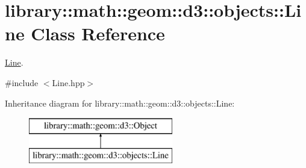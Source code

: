 \hypertarget{classlibrary_1_1math_1_1geom_1_1d3_1_1objects_1_1_line}{}\section{library\+:\+:math\+:\+:geom\+:\+:d3\+:\+:objects\+:\+:Line Class Reference}
\label{classlibrary_1_1math_1_1geom_1_1d3_1_1objects_1_1_line}


\hyperlink{classlibrary_1_1math_1_1geom_1_1d3_1_1objects_1_1_line}{Line}.  




{\ttfamily \#include $<$Line.\+hpp$>$}

Inheritance diagram for library\+:\+:math\+:\+:geom\+:\+:d3\+:\+:objects\+:\+:Line\+:\begin{figure}[H]
\begin{center}
\leavevmode
\includegraphics[height=2.000000cm]{classlibrary_1_1math_1_1geom_1_1d3_1_1objects_1_1_line}
\end{center}
\end{figure}
